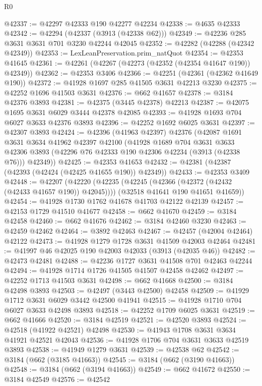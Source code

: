 \begin{lexlean}{R0}
\begin{coremodule}
@42337 := @42297 @42333 @190 @42277 @42234
@42338 := @4635 @42333
@42342 := @42294 (@42337 (@3913 (@42338 @62)))
@42349 := @42236 @285 @3631 @3631 @701 @3230 @42244 @42045
@42352 := @42282 (@42288 (@42342 @42349))
@42353 := LexLeanPreservation.prim_natQuot
@42354 := @42353 @41645
@42361 := @42261 (@42267 (@42273 (@42352 (@42354 @41647 @190)) @42349))
@42362 := @42353 @3406
@42366 := @42251 (@42361 (@42362 @41649 @190))
@42372 := @41928 @1697 @285 @41505 @3631 @42213 @3230
@42375 := @42252 @1696 @41503 @3631
@42376 := @662 @41657
@42378 := @3184 @42376 @3893
@42381 := @42375 (@3445 @42378) @42213
@42387 := @42075 @1695 @3631 @6029 @3444 @42378 @42085
@42393 := @41928 @1693 @704 @6027 @3633 @42376 @3893
@42396 := @42252 @1692 @6025 @3631
@42397 := @42307 @3893
@42424 := @42396
    (@41963 @42397)
    @42376
    (@42087
      @1691
      @3631
      @3634
      @41962
      @42397
      @42100
      (@41928
        @1689
        @704
        @3631
        @3633
        @42306
        @3893
        (@42296 @76 @42333 @190 @42306 @42234 (@3913 (@42338 @76)))
        @42349))
@42425 := @42353 @41653
@42432 := @42381 (@42387 (@42393 (@42424 (@42425 @41655 @190)) @42349))
@42433 := @42353 @3409
@42448 := @42207
    (@42220
      (@42235 (@42245 (@42366 (@42372 (@42432 (@42433 @41657 @190)) @42045))))
      (@32518 @41641 @190 @41651 @41659))
@42454 := @41928 @1730 @1762 @41678 @41703 @42122 @42139
@42457 := @42153 @1729 @41510 @41677
@42458 := @662 @41670
@42459 := @3184 @42458
@42460 := @662 @41676
@42462 := @3184 @42460 @3230
@42463 := @42459 @42462
@42464 := @3892 @42463
@42467 := @42457 (@42004 @42464) @42122
@42473 := @41928 @1279 @1728 @3631 @41509 @42003 @42464
@42481 := @41997 @46 @42025 @190 @42003 @42033 (@3913 (@42035 @46))
@42482 := @42473 @42481
@42488 := @42236 @1727 @3631 @41508 @701 @42463 @42244
@42494 := @41928 @1714 @1726 @41505 @41507 @42458 @42462
@42497 := @42252 @1713 @41503 @3631
@42498 := @662 @41668
@42500 := @3184 @42498 @3893
@42503 := @42497 (@3443 @42500) @42458
@42509 := @41929 @1712 @3631 @6029 @3442 @42500 @41941
@42515 := @41928 @1710 @704 @6027 @3633 @42498 @3893
@42518 := @42252 @1709 @6025 @3631
@42519 := @662 @41666
@42520 := @3184 @42519
@42521 := @42520 @3893
@42524 := @42518 (@41922 @42521) @42498
@42530 := @41943 @1708 @3631 @3634 @41921 @42521 @42043
@42536 := @41928 @1706 @704 @3631 @3633 @42519 @3893
@42538 := @41949 @1279 @3631
@42539 := @42538 @62
@42542 := @3184 (@662 (@3185 @41663))
@42545 := @3184 (@662 (@3190 @41663))
@42548 := @3184 (@662 (@3194 @41663))
@42549 := @662 @41672
@42550 := @3184 @42549
@42576 := @42542

\end{coremodule}
\end{lexlean}
